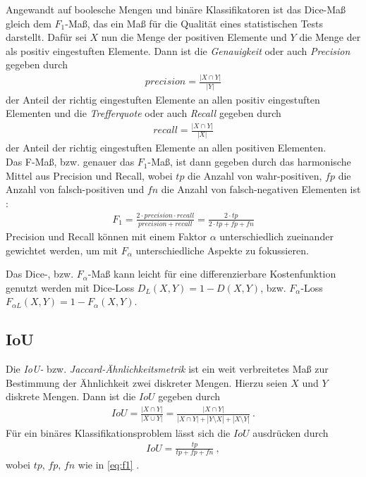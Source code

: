 Angewandt auf boolesche Mengen und binäre Klassifikatoren ist das Dice-Maß gleich dem $F_1$-Maß, das ein Maß für die Qualität eines statistischen Tests darstellt. Dafür sei $X$ nun die Menge der positiven Elemente und $Y$ die Menge der als positiv eingestuften Elemente. Dann ist die \textit{Genauigkeit} oder auch \textit{Precision} gegeben durch
\begin{align}
	\label{eq:precision} precision = \frac{|X \cap Y|}{|Y|}
\end{align}
der Anteil der richtig eingestuften Elemente an allen positiv eingestuften Elementen und die \textit{Trefferquote} oder auch \textit{Recall} gegeben durch
\begin{align}
	\label{eq:recall} recall = \frac{|X \cap Y|}{|X|}
\end{align}
der Anteil der richtig eingestuften Elemente an allen positiven Elementen. \\
Das F-Maß, bzw. genauer das $F_1$-Maß, ist dann gegeben durch das harmonische Mittel aus Precision und Recall, wobei $tp$ die Anzahl von wahr-positiven, $fp$ die Anzahl von falsch-positiven und $fn$ die Anzahl von falsch-negativen Elementen ist \cite{YutakaSasaki.2007}:
\begin{align}
	\label{eq:f1} F_{1} = \frac{2\cdot precision \cdot recall}{precision + recall} = \frac{2\cdot tp}{2 \cdot tp + fp + fn}
\end{align}
Precision und Recall können mit einem Faktor $\alpha$ unterschiedlich zueinander gewichtet werden, um mit $F_{\alpha}$ unterschiedliche Aspekte zu fokussieren. 

Das Dice-, bzw. $F_{\alpha}$-Maß kann leicht für eine differenzierbare Kostenfunktion genutzt werden mit Dice-Loss $D_{L}(X, Y) = 1 - D(X,Y)$, bzw. $F_{\alpha}$-Loss $F_{\alpha L}(X,Y) = 1 - F_{\alpha}(X,Y)$. 


\subsection{\acf{IoU}}

Die \textit{\acf{IoU}-} bzw. \textit{Jaccard-Ähnlichkeitsmetrik} ist ein weit verbreitetes Maß zur Bestimmung der Ähnlichkeit zwei diskreter Mengen. Hierzu seien $X$ und $Y$ diskrete Mengen. Dann ist die $IoU$ gegeben durch 
\begin{align}
	\label{eq:iou} IoU = \frac{|X\cap Y|}{|X \cup Y|} = \frac{| X \cap Y |}{| X \cap Y | + |Y \setminus X| + |X \setminus Y|}~.
\end{align} 
Für ein binäres Klassifikationsproblem lässt sich die $IoU$ ausdrücken durch 
\begin{align}
	\label{eq:iou-binary} IoU = \frac{tp}{tp + fp + fn}~,
\end{align}
wobei $tp$, $fp$, $fn$ wie in \autoref{eq:f1} \cite{Fletcher.2018}. 

